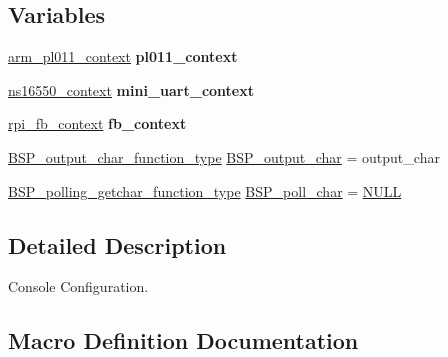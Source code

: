 \subsection*{Variables}
\begin{DoxyCompactItemize}
\item 
\mbox{\label{arm_2raspberrypi_2console_2console-config_8c_abf78681fc7958331a4538d460b324055}} 
\mbox{\hyperlink{structarm__pl011__context}{arm\+\_\+pl011\+\_\+context}} {\bfseries pl011\+\_\+context}
\item 
\mbox{\label{arm_2raspberrypi_2console_2console-config_8c_a61ecdd2d3d6069b24e3046edbf5b8632}} 
\mbox{\hyperlink{structns16550__context}{ns16550\+\_\+context}} {\bfseries mini\+\_\+uart\+\_\+context}
\item 
\mbox{\label{arm_2raspberrypi_2console_2console-config_8c_af1ffb790c812ec97b73da68ce681785c}} 
\mbox{\hyperlink{structrpi__fb__context}{rpi\+\_\+fb\+\_\+context}} {\bfseries fb\+\_\+context}
\item 
\mbox{\hyperlink{bspIo_8h_a0b0dff1c3d35110ae303b4098c60dc14}{B\+S\+P\+\_\+output\+\_\+char\+\_\+function\+\_\+type}} \mbox{\hyperlink{arm_2raspberrypi_2console_2console-config_8c_a5fb8c9c4f076f0340b4a17ed432ced5c}{B\+S\+P\+\_\+output\+\_\+char}} = output\+\_\+char
\item 
\mbox{\hyperlink{bspIo_8h_a132b9ceff428a634ece5dfaac7ef1006}{B\+S\+P\+\_\+polling\+\_\+getchar\+\_\+function\+\_\+type}} \mbox{\hyperlink{arm_2raspberrypi_2console_2console-config_8c_ae5846eecdfa8f2813504371bf01c29b0}{B\+S\+P\+\_\+poll\+\_\+char}} = \mbox{\hyperlink{bestcomm__api_8h_a872bb74de61c3689ccd5b41873fce42c}{N\+U\+LL}}
\end{DoxyCompactItemize}


\subsection{Detailed Description}
Console Configuration. 



\subsection{Macro Definition Documentation}
\mbox{\label{arm_2raspberrypi_2console_2console-config_8c_aba8a344c89ec5486086ceff906bcf129}} 
